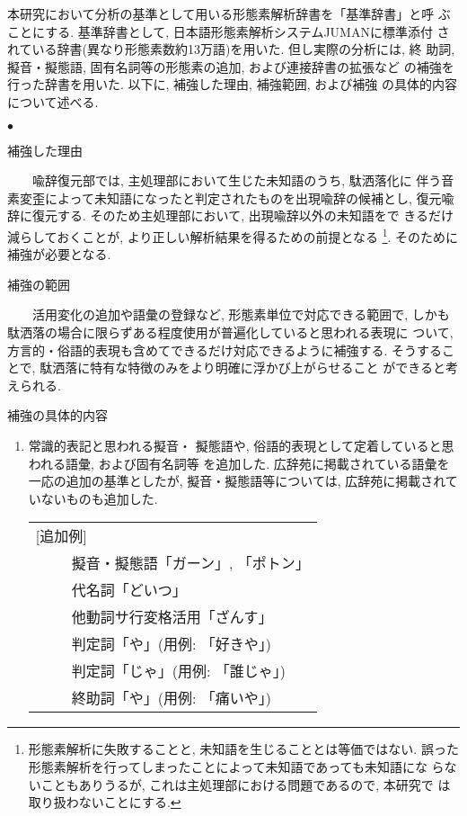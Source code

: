 本研究において分析の基準として用いる形態素解析辞書を「基準辞書」と呼
ぶことにする. 基準辞書として, 日本語形態素解析システムJUMANに標準添付
されている辞書(異なり形態素数約13万語)を用いた. 但し実際の分析には, 終
助詞, 擬音・擬態語, 固有名詞等の形態素の追加, および連接辞書の拡張など
の補強を行った辞書を用いた. 以下に, 補強した理由, 補強範囲, および補強
の具体的内容について述べる.  
\vspace*{1em}
\begin{list}{\Large $\bullet$}{}

\item 補強した理由

\ \ \ \ 喩辞復元部では, 主処理部において生じた未知語のうち, 駄洒落化に
伴う音素変歪によって未知語になったと判定されたものを出現喩辞の候補とし, 
復元喩辞に復元する. そのため主処理部において, 出現喩辞以外の未知語をで
きるだけ減らしておくことが, より正しい解析結果を得るための前提となる
\footnote{形態素解析に失敗することと, 未知語を生じることとは等価ではない. 
誤った形態素解析を行ってしまったことによって未知語であっても未知語にな
らないこともありうるが, これは主処理部における問題であるので, 本研究で
は取り扱わないことにする.}. そのために補強が必要となる.

\item 補強の範囲

\ \ \ \ 活用変化の追加や語彙の登録など, 形態素単位で対応できる範囲で, 
しかも駄洒落の場合に限らずある程度使用が普遍化していると思われる表現に
ついて, 方言的・俗語的表現も含めてできるだけ対応できるように補強する. 
そうすることで, 駄洒落に特有な特徴のみをより明確に浮かび上がらせること
ができると考えられる. 

\item 補強の具体的内容

\begin{enumerate}
\def\labelenumi{}
\item 常識的表記と思われる擬音・
擬態語や, 俗語的表現として定着していると思われる語彙, および固有名詞等
を追加した. 広辞苑\cite{Koujien1969}に掲載されている語彙を一応の追加の基準としたが, 擬音・擬態語等については, 広辞苑に掲載されていないものも追加した.  

\vspace*{1em}\begin{tabular}{l}
[追加例]\\
\ \ \ \ \ 擬音・擬態語「ガーン」, 「ポトン」\\
\ \ \ \ \ 代名詞「どいつ」\\
\ \ \ \ \ 他動詞サ行変格活用「ざんす」\\
\ \ \ \ \ 判定詞「や」(用例: 「好きや」)\\
\ \ \ \ \ 判定詞「じゃ」(用例: 「誰じゃ」)\\
\ \ \ \ \ 終助詞「や」(用例: 「痛いや」)\\
\end{tabular}\vspace*{1em}


\end{enumerate}
\end{list}
